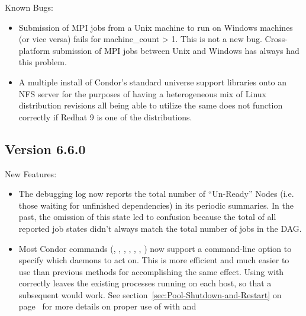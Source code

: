 \noindent Known Bugs:

\begin{itemize}

\item Submission of MPI jobs from a Unix machine to run on Windows
machines (or vice versa) fails for machine\_count > 1.  This is
not a new bug.  Cross-platform submission of MPI jobs between
Unix and Windows has always had this problem.

\item A multiple install of Condor's standard universe support libraries
onto an NFS server for the purposes of having a heterogeneous mix of Linux
distribution revisions all being able to utilize the same 
does not function correctly if Redhat 9 is one of the distributions.

\end{itemize}


\subsection{\label{sec:New-6-6-0}Version 6.6.0}

\noindent New Features:

\begin{itemize}

\item The  debugging log now reports the total number
      of ``Un-Ready'' Nodes (i.e. those waiting for unfinished
      dependencies) in its periodic summaries.  In the past, the
      omission of this state led to confusion because the total of all
      reported job states didn't always match the total number of jobs
      in the DAG.

\item Most Condor commands (, ,
  , , ,
  , ) now support a 
  command-line option to specify which daemons to act on.
  This is more efficient and much easier to use than previous methods
  for accomplishing the same effect.
  Using  with  correctly leaves the existing
   processes running on each host, so that a subsequent
   would work.
  See section~\ref{sec:Pool-Shutdown-and-Restart} on
  page~\pageref{sec:Pool-Shutdown-and-Restart} for more details on
  proper use of  with  and 

\end{itemize}

